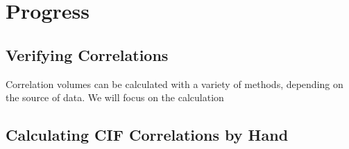 \documentclass[a4, 12pt]{article}
\begin{document}
\subsubsection{}

\section{Progress}
\subsection{Verifying Correlations}

Correlation volumes can be calculated with a variety of methods, depending on the source of data. We will focus on the calculation 




\subsection{Calculating CIF Correlations by Hand}

 
\end{document}
